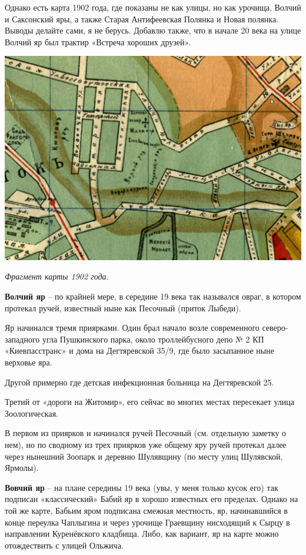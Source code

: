 Однако есть карта 1902 года, где показаны не как улицы, но как урочища, Волчий и Саксонский яры, а также Старая Антифеевская Полянка и Новая полянка. Выводы делайте сами, я не берусь. Добавлю также, что в начале 20 века на улице Волчий яр был трактир «Встреча хороших друзей».

\begin{center}
\includegraphics[width=\linewidth]{rpix/volch01.jpg}

\textit{Фрагмент карты 1902 года.}
\end{center}

\medskip

\textbf{Волчий яр} – по крайней мере, в середине 19 века так назывался овраг, в котором протекал ручей, известный ныне как Песочный (приток Лыбеди).

Яр начинался тремя приярками. Один брал начало возле современного северо-западного угла Пушкинского парка, около троллейбусного депо № 2 КП «Киевпасстранс» и дома на Дегтяревской 35/9, где было засыпанное ныне верховье яра.

Другой примерно где детская инфекционная больница на Дегтяревской 25. 

Третий от «дороги на Житомир», его сейчас во многих местах пересекает улица Зоологическая. 

В первом из приярков и начинался ручей Песочный (см. отдельную заметку о нем), но по сводному из трех приярков уже общему яру ручей протекал далее через нынешний Зоопарк и деревню Шулявщину (по месту улиц Шулявской, Ярмолы).\\

\medskip

\textbf{Вовчий яр} – на плане середины 19 века (увы, у меня только кусок его) так подписан «классический» Бабий яр в хорошо известных его пределах. Однако на той же карте, Бабьим яром подписана смежная местность, яр, начинавшийся в конце переулка Чаплыгина и через урочище Граевщину нисходящий к Сырцу в направлении Куренёвского кладбища. Либо, как вариант, яр на карте можно отождествить с улицей Ольжича.\\

